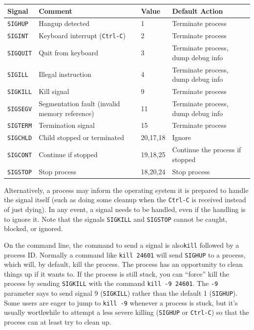\begin{center}
	\begin{tabular}{l|l|l|l}
		\textbf{Signal}  & \textbf{Comment}                              & \textbf{Value} & \textbf{Default Action}            \\ \hline
		\texttt{SIGHUP}  & Hangup detected                               & 1              & Terminate process                  \\
		\texttt{SIGINT}  & Keyboard interrupt (\texttt{Ctrl-C})          & 2              & Terminate process                  \\
		\texttt{SIGQUIT} & Quit from keyboard                            & 3              & Terminate process, dump debug info \\
		\texttt{SIGILL}  & Illegal instruction                           & 4              & Terminate process, dump debug info \\
		\texttt{SIGKILL} & Kill signal                                   & 9              & Terminate process                  \\
		\texttt{SIGSEGV} & Segmentation fault (invalid memory reference) & 11             & Terminate process, dump debug info \\
		\texttt{SIGTERM} & Termination signal                            & 15             & Terminate process                  \\
		\texttt{SIGCHLD} & Child stopped or terminated                   & 20,17,18       & Ignore                             \\
		\texttt{SIGCONT} & Continue if stopped                           & 19,18,25       & Continue the process if stopped    \\
		\texttt{SIGSTOP} & Stop process                                  & 18,20,24       & Stop process                       \\
	\end{tabular}
\end{center}


Alternatively, a process may inform the operating system it is prepared to handle the signal itself (such as doing some cleanup when the \texttt{Ctrl-C} is received instead of just dying). In any event, a signal needs to be handled, even if the handling is to ignore it. Note that the signals \texttt{SIGKILL} and \texttt{SIGSTOP} cannot be caught, blocked, or ignored.

On the command line, the command to send a signal is also\texttt{kill} followed by a process ID. Normally a command like \texttt{kill 24601} will send \texttt{SIGHUP} to a process, which will, by default, kill the process. The process has an opportunity to clean things up if it wants to. If the process is still stuck, you can ``force'' kill the process by sending \texttt{SIGKILL} with the command \texttt{kill -9 24601}. The \texttt{-9} parameter says to send signal 9 (\texttt{SIGKILL}) rather than the default 1 (\texttt{SIGHUP}). Some users are eager to jump to \texttt{kill -9} whenever a process is stuck, but it's usually worthwhile to attempt a less severe killing (\texttt{SIGHUP} or \texttt{Ctrl-C}) so that the process can at least try to clean up.


